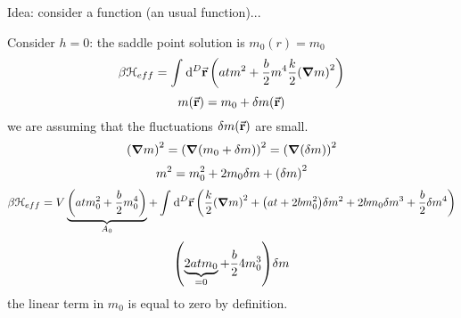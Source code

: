 \documentclass[../main/main.tex]{subfiles}
\begin{document}
Idea: consider a function (an usual function)...

Consider \( h=0 \): the saddle point solution is \( m_0 (r) = m_0 \)
\begin{equation}
  \beta \mathcal{H}_{eff} = \int_{}^{} \dd[D]{\va{r}} \qty( a t m^2 + \frac{b}{2} m^4 \frac{k}{2} \qty(\grad m)^2 )
\end{equation}
\begin{equation}
  m(\va{r}) = m_0 + \delta m(\va{r})
\end{equation}
we are assuming that the fluctuations \(  \delta m(\va{r})\) are small.
\begin{equation}
  \qty(\grad m)^2 = \qty(\grad \qty(m_0 + \delta m) )^2 = \qty(\grad \qty(\delta m) )^2
\end{equation}
\begin{equation}
  m^2 = m_0^2 + 2 m_0 \delta m + \qty(\delta m)^2
\end{equation}
\begin{equation}
  \beta \mathcal{H}_{eff} = V \underbrace{ \qty(a t m_0^2 + \frac{b}{2} m_0^4) }_{A_0}
  + \int_{}^{} \dd[D]{\va{r}} \qty(\frac{k}{2}\qty(\grad m)^2 + \qty(a t + 2 b m_0^2)\delta  m^2 + 2 b m_0 \delta m^3 + \frac{b}{2} \delta m^4 )
\end{equation}
\begin{equation}
  \qty( \underbrace{2 a t m_0}_{=0}  + \frac{b}{2} 4 m_0^3 )  \delta m
\end{equation}
the linear term  in \( m_0 \) is equal to zero by definition.
\end{document}

